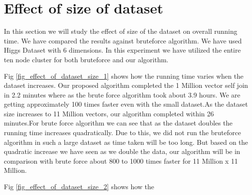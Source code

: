 \section{Effect of size of dataset}

In this section we will study the effect of size of the dataset on overall running
time. We have compared the results against bruteforce algorithm.
We have used Higgs Dataset with 6 dimensions. In this experiment we
have utilized the entire ten node cluster for both bruteforce and our
algorithm.

Fig \cref{fig_effect_of_dataset_size_1} shows how
the running time varies when the dataset increases.
Our proposed algorithm completed the 1 Million vector self join
in 2.2 minutes where as the brute force algorithm took about 3.9
hours. We are getting approximately 100 times faster even with the small
dataset.As the dataset size increases to 11 Million vectors, our
algorithm completed within 26 minutes.For brute force algorithm we can see that as the dataset doubles the running time
increases quadratically.  Due to this, we did not run the bruteforce
algorithm in such a large dataset as time taken will be too long. But
based on the quadratic increase we have seen as we double the data, our algorithm will be in comparison with
brute force about 800 to 1000 times faster for 11 Million x 11 Million.

Fig \cref{fig_effect_of_dataset_size_2} shows how the

\bigskip

